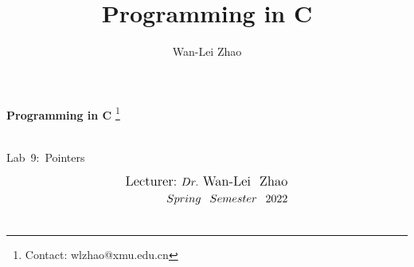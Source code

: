\documentclass[t]{beamer}
\title{Programming in C}
\author{Wan-Lei Zhao}
\newcommand\blfootnote[1]{
  \begingroup
  \renewcommand\thefootnote{}\footnote{#1}
  \addtocounter{footnote}{-1}
  \endgroup
}
\begin{document}
\begin{frame}
   \begin{center}
    \vspace{24pt}
    \Huge\textbf{Programming in C}\blfootnote{Contact: wlzhao@xmu.edu.cn}\\
     \Huge{\mbox{Lab 9: Pointers}}
    \vspace{36pt}
  \end{center}
  \begin{align*}
   \vspace{18pt}
      \large{\mbox{Lecturer:}~Dr.~\mbox{Wan-Lei~~Zhao}} \\
      \large{Spring~~Semester~~2022} \\
   \vspace{30pt}
  \end{align*}
\end{frame}



\end{document}
